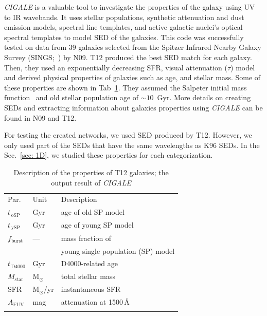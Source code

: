     {\em CIGALE} is a valuable tool to investigate the properties of the galaxy using UV to IR wavebands.
    It uses stellar populations, synthetic attenuation and dust emission models, spectral line templates, and active galactic nuclei's optical spectral templates to model SED of the galaxies.
    This code was successfully tested on data from 39 galaxies selected from the Spitzer Infrared Nearby Galaxy Survey (SINGS;~\citep{Kennicutt03}) by N09.
    T12 produced the best SED match for each galaxy.
    Then, they used an exponentially decreasing SFR, visual attenuation ($\tau$) model and derived physical properties of galaxies such as age, and stellar mass.
    Some of these properties are shown in Tab~\ref{tab: props}.
    They assumed the Salpeter initial mass function~\citep{Salpeter55} and old stellar population age of $\sim 10$~Gyr.
    More details on creating SEDs and extracting information about galaxies properties using {\em CIGALE} can be found in N09 and T12.
    
     For testing the created networks, we used SED produced by T12. 
     However, we only used part of the SEDs that have the same wavelengths as K96 SEDs. %
     In the Sec.~\ref{sec: 1D}, we studied these properties for each categorization.
    
    
    \begin{table}
\caption[]{Description of the properties of T12 galaxies; the output result of {\em CIGALE}}     
\label{tab: props}
\centering
\begin{tabular}{l l l}
\hline\hline
\noalign{\smallskip}
Par. & Unit & Description\\
\noalign{\smallskip}
\hline
\noalign{\smallskip}
$t_{\,\mathrm{oSP}}$ & Gyr & age of old SP model \\
$t_{\,\mathrm{ySP}}$ & Gyr & age of young SP model \\
$f_\mathrm{burst}$ & --- & mass fraction of \\
& & young single population (SP) model \\
\noalign{\smallskip}
$t_{\,\mathrm{D4000}}$ & Gyr & D4000-related age \\
\noalign{\smallskip}
$M_\mathrm{star}$ & M$_\odot$ & total stellar mass  \\
SFR & M$_\odot$/yr & instantaneous SFR  \\
$A_\mathrm{FUV}$ & mag & attenuation at 1500\,\AA{} \\
\noalign{\smallskip}
\hline
\end{tabular}
\end{table}
